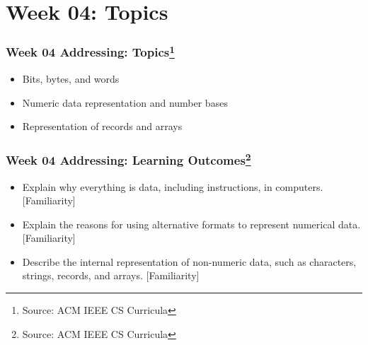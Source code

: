 
\section{Week 04: Topics}
\begin{frame}[fragile]
\frametitle{Week 04 Addressing:
Topics\footnote{Source: ACM IEEE CS Curricula}}

\begin{itemize}
\item Bits, bytes, and words
\item Numeric data representation and number bases
\item Representation of records and arrays
\end{itemize}
\end{frame}


\begin{frame}[fragile]
\frametitle{Week 04 Addressing:
Learning Outcomes\footnote{Source: ACM IEEE CS Curricula}}
\begin{itemize}
\item Explain why everything is data, including instructions, in computers. [Familiarity]
\item Explain the reasons for using alternative formats to represent numerical data. [Familiarity]
\item Describe the internal representation of non-numeric data, such as characters, strings, records, and arrays.  [Familiarity]
\end{itemize}

\end{frame}

